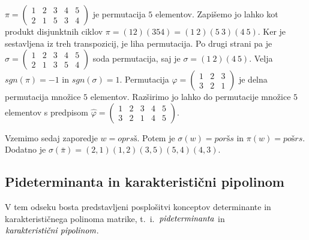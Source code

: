 \documentclass[mat1]{fmfdelo}
\newcommand{\pojem}[1]{\ensuremath{\emph{#1}}}
\begin{document}
\begin{zgled}
$\pi = \begin{pmatrix}
	1 & 2 & 3 & 4 & 5 \\
	2 & 1 & 5 & 3 & 4
\end{pmatrix}$ je permutacija $5$ elementov. Zapišemo jo lahko kot produkt disjunktnih ciklov $\pi = (1 2)(3 5 4) = (1~2)(5~3)(4~5)$. Ker je sestavljena iz treh transpozicij, je liha permutacija. Po drugi strani pa je $\sigma = \begin{pmatrix}
1 & 2 & 3 & 4 & 5 \\
2 & 1 & 3 & 5 & 4
\end{pmatrix}$ soda permutacija, saj je $\sigma = (1~2)(4~5)$. Velja $sgn(\pi) = -1$ in $sgn(\sigma) = 1$. Permutacija $\varphi = \begin{pmatrix}
1 & 2 & 3 \\
3 & 2 & 1
\end{pmatrix}$ je delna permutacija množice $5$ elementov. Razširimo jo lahko do permutacije množice $5$ elementov s predpisom $\hat{\varphi} = \begin{pmatrix}
1 & 2 & 3 & 4 & 5 \\
3 & 2 & 1 & 4 & 5
\end{pmatrix}$.

Vzemimo sedaj zaporedje $w = oprsš$. Potem je $\sigma(w) = poršs$ in $\pi(w) = pošrs$. Dodatno je $\sigma(\bar{\pi}) = (2, 1)(1, 2)(3, 5)(5, 4)(4, 3)$.
\end{zgled}

\subsection{Pideterminanta in karakteristični pipolinom}\label{subsect:pidetinpipoly}
V tem odseku bosta predstavljeni posplošitvi konceptov determinante in karakterističnega polinoma matrike, t.~i.~\pojem{pideterminanta} in \pojem{karakteristični pipolinom}.
\end{document}
